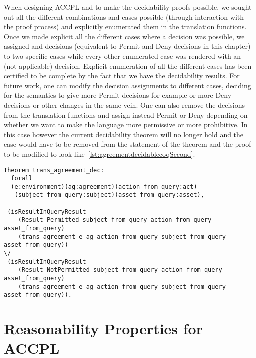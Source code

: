 When designing \ac{ACCPL} and to make the decidability proofs possible, we sought out all the different combinations and cases possible (through interaction with the proof process) and explicitly enumerated them in the translation functions. Once we made explicit all the different cases where a decision was possible, we assigned  and  decisions (equivalent to Permit and Deny decisions in this chapter) to two specific cases while every other enumerated case was rendered with an  (not applicable) decision. Explicit enumeration of all the different cases has been certified to be complete by the fact that we have the decidability results. For future work, one can modify the decision assignments to different cases, deciding for the semantics to give more Permit decisions for example or more Deny decisions or other changes in the same vein. One can also remove the  decisions from the translation functions and assign instead Permit or Deny depending on whether we want to make the language more permissive or more prohibitive. In this case however the current decidability theorem will no longer hold and the  case would have to be removed from the statement of the theorem and the proof to be modified to look like~\ref{lst:agreementdecidablecoqSecond}.

\begin{lstlisting}
Theorem trans_agreement_dec:
  forall
  (e:environment)(ag:agreement)(action_from_query:act)
   (subject_from_query:subject)(asset_from_query:asset),

 (isResultInQueryResult 
    (Result Permitted subject_from_query action_from_query asset_from_query)
    (trans_agreement e ag action_from_query subject_from_query asset_from_query)) 
\/
 (isResultInQueryResult 
    (Result NotPermitted subject_from_query action_from_query asset_from_query)
    (trans_agreement e ag action_from_query subject_from_query asset_from_query)).

\end{lstlisting}


\section{Reasonability Properties for ACCPL}

